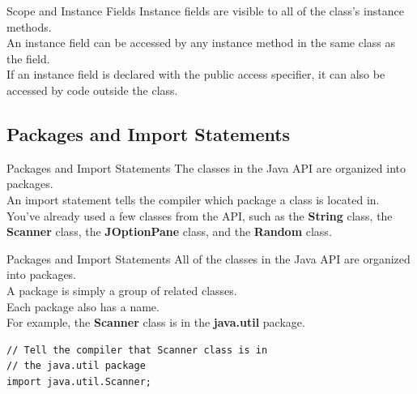 \documentclass[11pt]{beamer}
\begin{document}
\begin{frame}{Scope and Instance Fields}
    Instance fields are visible to all of the class’s instance methods. \\ \vspace{1em}
    An instance field can be accessed by any instance method in the same class as the field. \\ \vspace{1em}
    If an instance field is declared with the public access specifier, it can also be accessed by code outside the class.
\end{frame}

\subsection{Packages and Import Statements}
\begin{frame}{Packages and Import Statements}
    The classes in the Java API are organized into packages. \\ \vspace{1em}
    An import statement tells the compiler which package a class is located in. \\ \vspace{1em} 
    You've already used a few classes from the API, such as the \textbf{String} class, the \textbf{Scanner} class, the \textbf{JOptionPane} class, and the \textbf{Random} class. 
\end{frame}

\begin{frame}[fragile]{Packages and Import Statements}
    All of the classes in the Java API are organized into packages. \\ \vspace{1em} 
    A package is simply a group of related classes. \\ \vspace{1em} 
    Each package also has a name. \\ \vspace{1em} 
    For example, the \textbf{Scanner} class is in the \textbf{java.util} package.
        \begin{lstlisting}
// Tell the compiler that Scanner class is in
// the java.util package
import java.util.Scanner;
        \end{lstlisting}
\end{frame}
\end{document}
